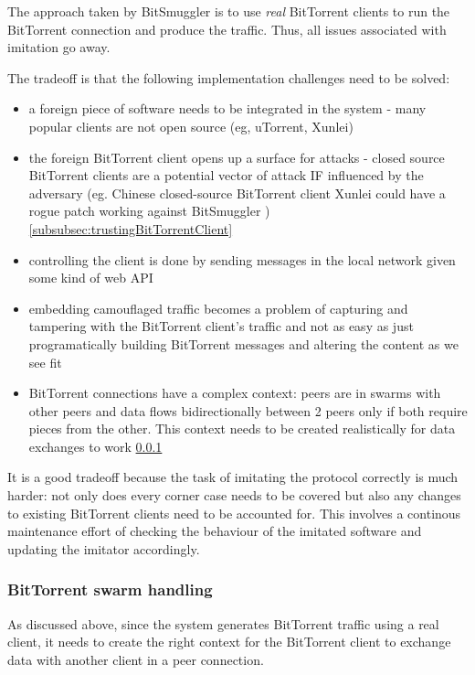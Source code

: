 \documentclass[11pt]{article} %
\newcommand{\projectName}{BitSmuggler }
\begin{document}
The approach taken by \projectName is to use \textit{real} BitTorrent clients to run the BitTorrent connection and produce the traffic. Thus, all issues associated with imitation go away.

The tradeoff is that the following implementation challenges need to be solved:
\begin{itemize}
\item a foreign piece of software needs to be integrated in the system - many popular clients are not open source (eg, uTorrent, Xunlei)
\item the foreign BitTorrent client opens up a surface for attacks - closed source BitTorrent clients are a potential vector of attack IF influenced by the adversary (eg. Chinese closed-source BitTorrent client Xunlei could have a rogue patch working against \projectName) \ref{subsubsec:trustingBitTorrentClient}
\item controlling the client is done by sending messages in the local network given some kind of web API
\item embedding camouflaged traffic becomes a problem of capturing and tampering with the BitTorrent client's traffic and not as easy as just programatically building BitTorrent messages and altering the content as we see fit
\item BitTorrent connections have a complex context: peers are in swarms with other peers and data flows bidirectionally between 2 peers only if both require pieces from the other. This context needs to be created realistically for data exchanges to work \ref{subsubsec:swarmHandling}
\end{itemize}

It is a good tradeoff because the task of imitating the protocol correctly is much harder: not only does every corner case needs to be covered but also any changes to existing BitTorrent clients need to be accounted for. This involves a continous maintenance effort of checking the behaviour of the imitated software and updating the imitator accordingly.

\subsubsection{BitTorrent swarm handling}
\label{subsubsec:swarmHandling}

As discussed above, since the system generates BitTorrent traffic using a real client, it needs to create the right context for the BitTorrent client to exchange data with another client in a peer connection.
\end{document}
